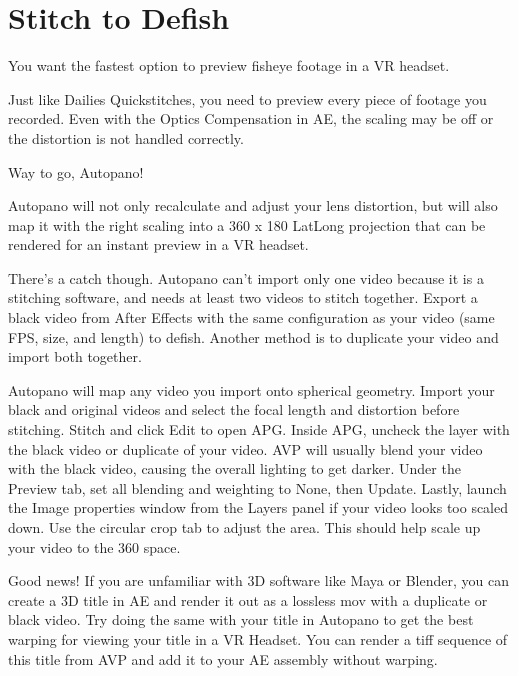 \chapter{Stitch to Defish}
\pagecolor{white}
\label{chap:52}
\begin{fullwidth}

\problem

{\large You want the fastest option to preview fisheye footage in a VR headset. \par}

Just like Dailies Quickstitches, you need to preview every piece of footage you recorded. Even with the Optics Compensation in AE, the scaling may be off or the distortion is not handled correctly.

\solution

{\large Way to go, Autopano! \par}

Autopano will not only recalculate and adjust your lens distortion, but will also map it with the right scaling into a 360 x 180 LatLong projection that can be rendered for an instant preview in a VR headset.

There’s a catch though. Autopano can’t import only one video because it is a stitching software, and needs at least two videos to stitch together. Export a black video from After Effects with the same configuration as your video (same FPS, size, and length) to defish. Another method is to duplicate your video and import both together.


Autopano will map any video you import onto spherical geometry. Import your black and original videos and select the focal length and distortion before stitching. Stitch and click Edit to open APG. Inside APG, uncheck the layer with the black video or duplicate of your video. AVP will usually blend your video with the black video, causing the overall lighting to get darker. Under the Preview tab, set all blending and weighting to None, then Update. Lastly, launch the Image properties window from the Layers panel if your video looks too scaled down. Use the circular crop tab to adjust the area. This should help scale up your video to the 360 space.




Good news! If you are unfamiliar with 3D software like Maya or Blender, you can create a 3D title in AE and render it out as a lossless mov with a duplicate or black video. Try doing the same with your title in Autopano to get the best warping for viewing your title in a VR Headset. You can render a tiff sequence of this title from AVP and add it to your AE assembly without warping.


\clearpage
\end{fullwidth}